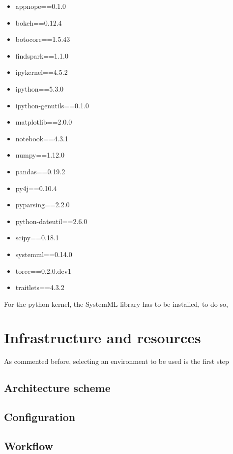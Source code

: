 \documentclass[11pt]{article} %
\begin{document}
    \begin{itemize}
      \item appnope==0.1.0
      \item bokeh==0.12.4
      \item botocore==1.5.43
      \item findspark==1.1.0
      \item ipykernel==4.5.2
      \item ipython==5.3.0
      \item ipython-genutils==0.1.0
      \item matplotlib==2.0.0
      \item notebook==4.3.1
      \item numpy==1.12.0
      \item pandas==0.19.2
      \item py4j==0.10.4
      \item pyparsing==2.2.0
      \item python-dateutil==2.6.0
      \item scipy==0.18.1
      \item systemml==0.14.0
      \item toree==0.2.0.dev1
      \item traitlets==4.3.2
    \end{itemize}

    For the python kernel, the SystemML library has to be installed, to do so,



\section{Infrastructure and resources}
  \label{sec:infrastructure_and_resources}

  As commented before, selecting an environment to be used is the first step

  \subsection{Architecture scheme}



  \subsection{Configuration}

  \subsection{Workflow}
\end{document}
